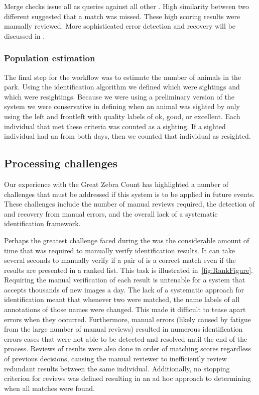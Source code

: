             Merge checks issue all \exemplars{} as queries against all other \exemplars{}.
            High similarity between two different \names{} suggested that a match was missed.
            These high scoring results were manually reviewed.
            More sophisticated error detection and recovery will be discussed in .

        \subsubsection{Population estimation}
            The final step for the \GZC{} workflow was to estimate the number of animals in the park.
            Using the identification algorithm we defined which \annots{} were sightings and which were
              resightings.
            Because we were using a preliminary version of the system we were conservative in defining when an
              animal was sighted by only using the left and frontleft \annots{} with quality labels of ok, good, or
              excellent.
            Each individual that met these criteria was counted as a sighting.
            If a sighted individual had an \annot{} from both days, then we counted that individual as resighted.

    \subsection{Processing challenges}
        Our experience with the Great Zebra Count has highlighted a number of challenges that must be addressed if this
        system is to be applied in future events. These challenges include the number of manual reviews required, the
        detection of and recovery from manual errors, and the overall lack of a systematic identification framework.

        Perhaps the greatest challenge faced during the \GZC{} was the considerable amount of time that was
          required to manually verify identification results.
        It can take several seconds to manually verify if a pair of \annots{} is a correct match even if the
          results are presented in a ranked list.
        This task is illustrated in~\cref{fig:RankFigure}.
        Requiring the manual verification of each result is untenable for a system that accepts thousands of new
          images a day.
        The lack of a systematic approach for identification meant that whenever two \annots{} were matched, the
          name labels of all annotations of those names were changed.
        This made it difficult to tease apart errors when they occurred.
        Furthermore, manual errors (likely caused by fatigue from the large number of manual reviews) resulted in
          numerous identification errors cases that were not able to be detected and resolved until the end of the
          process.
        Reviews of results were also done in order of matching scores regardless of previous decisions, causing
          the manual reviewer to inefficiently review redundant results between the same individual.
        Additionally, no stopping criterion for reviews was defined resulting in an ad hoc approach to
          determining when all matches were found.

